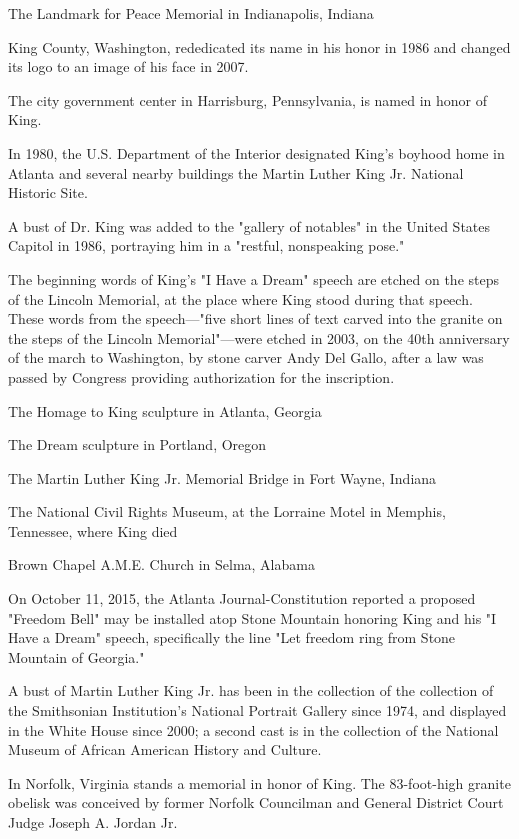 The Landmark for Peace Memorial in Indianapolis, Indiana

King County, Washington, rededicated its name in his honor in 1986 and
changed its logo to an image of his face in 2007.

The city government center in Harrisburg, Pennsylvania, is named in
honor of King.

In 1980, the U.S. Department of the Interior designated King's boyhood
home in Atlanta and several nearby buildings the Martin Luther King Jr.
National Historic Site.

A bust of Dr. King was added to the "gallery of notables" in the United
States Capitol in 1986, portraying him in a "restful, nonspeaking pose."

The beginning words of King's "I Have a Dream" speech are etched on the
steps of the Lincoln Memorial, at the place where King stood during that
speech. These words from the speech---"five short lines of text carved
into the granite on the steps of the Lincoln Memorial"---were etched in
2003, on the 40th anniversary of the march to Washington, by stone
carver Andy Del Gallo, after a law was passed by Congress providing
authorization for the inscription.

The Homage to King sculpture in Atlanta, Georgia

The Dream sculpture in Portland, Oregon

The Martin Luther King Jr. Memorial Bridge in Fort Wayne, Indiana

The National Civil Rights Museum, at the Lorraine Motel in Memphis,
Tennessee, where King died

Brown Chapel A.M.E. Church in Selma, Alabama

On October 11, 2015, the Atlanta Journal-Constitution reported a
proposed "Freedom Bell" may be installed atop Stone Mountain honoring
King and his "I Have a Dream" speech, specifically the line "Let freedom
ring from Stone Mountain of Georgia."

A bust of Martin Luther King Jr. has been in the collection of the
collection of the Smithsonian Institution's National Portrait Gallery
since 1974, and displayed in the White House since 2000; a second cast
is in the collection of the National Museum of African American History
and Culture.

In Norfolk, Virginia stands a memorial in honor of King. The
83-foot-high granite obelisk was conceived by former Norfolk Councilman
and General District Court Judge Joseph A. Jordan Jr.

